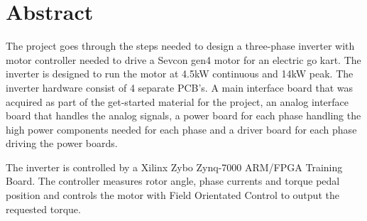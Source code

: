 \section{Abstract}

The project goes through the steps needed to design a three-phase inverter with motor controller needed to drive a Sevcon gen4 motor for an electric go kart. 
The inverter is designed to run the motor at 4.5kW continuous and 14kW peak. The inverter hardware consist of 4 separate PCB's. A main interface board that was acquired as part of the get-started material for the project, an analog interface board that handles the analog signals, a power board for each phase handling the high power components needed for each phase and a driver board for each phase driving the power boards. 

The inverter is controlled by a Xilinx Zybo Zynq-7000 ARM/FPGA Training Board. The controller measures rotor angle, phase currents and torque pedal position and controls the motor with Field Orientated Control to output the requested torque. 








